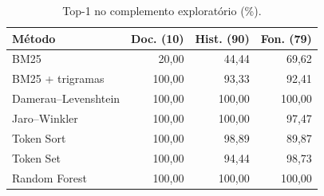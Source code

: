 \begin{table}[tb]
\caption{Top-1 no complemento exploratório (\%).}
\label{tab:complementar}
\centering
\small
\setlength{\tabcolsep}{3pt}
\begin{tabular}{lrrr}
\toprule
Método & Doc. (10) & Hist. (90) & Fon. (79) \\
\midrule
BM25 & 20,00 & 44,44 & 69,62 \\
BM25 + trigramas & 100,00 & 93,33 & 92,41 \\
Damerau--Levenshtein & 100,00 & 100,00 & 100,00 \\
Jaro--Winkler & 100,00 & 100,00 & 97,47 \\
Token Sort & 100,00 & 98,89 & 89,87 \\
Token Set & 100,00 & 94,44 & 98,73 \\
Random Forest & 100,00 & 100,00 & 100,00 \\
\bottomrule
\end{tabular}
\par{}
\end{table}

